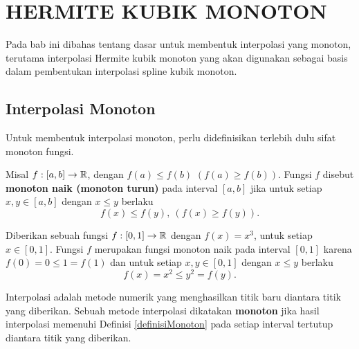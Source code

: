 \chapter{HERMITE KUBIK MONOTON}
Pada bab ini dibahas tentang dasar untuk membentuk interpolasi yang monoton, terutama interpolasi Hermite kubik monoton yang akan digunakan sebagai basis dalam pembentukan interpolasi spline kubik monoton.
\section{Interpolasi Monoton}

Untuk membentuk interpolasi monoton, perlu didefinisikan terlebih dulu sifat monoton fungsi.

\begin{definisi}\label{definisiMonoton}
     Misal $f:[a,b] \to \mathbb{R}$, dengan $f(a) \leq f(b)$ $(f(a) \geq f(b))$. Fungsi $f$ disebut \textbf{monoton naik (monoton turun)} pada interval $[a,b]$ jika untuk setiap $x,y \in [a,b]$ dengan $x \leq y$ berlaku
    \begin{equation*}
        f(x) \leq f(y),\:(f(x) \geq f(y)).
    \end{equation*}
\end{definisi}
\begin{contoh}
    Diberikan sebuah fungsi \(f:[0,1] \to \mathbb{R}\) dengan $f(x)=x^3$, untuk setiap $x \in [0,1]$. Fungsi $f$ merupakan fungsi monoton naik pada interval $[0,1]$ karena $f(0) = 0 \leq 1 = f(1)$ dan untuk setiap $x,y \in [0,1]$ dengan $x \leq y$ berlaku
    \begin{equation*}
        f(x) = x^2 \leq y^2 = f(y).
    \end{equation*}
\end{contoh}

Interpolasi adalah metode numerik yang menghasilkan titik baru diantara titik yang diberikan. Sebuah metode interpolasi dikatakan \textbf{monoton} jika hasil interpolasi memenuhi Definisi \ref{definisiMonoton} pada setiap interval tertutup diantara titik yang diberikan.

